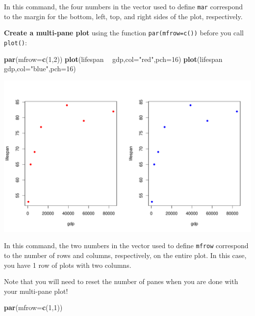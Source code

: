 \documentclass[
]{book}
\newenvironment{Shaded}{\begin{snugshade}}{\end{snugshade}}
\newcommand{\DataTypeTok}[1]{\textcolor[rgb]{0.13,0.29,0.53}{#1}}
\newcommand{\DecValTok}[1]{\textcolor[rgb]{0.00,0.00,0.81}{#1}}
\newcommand{\KeywordTok}[1]{\textcolor[rgb]{0.13,0.29,0.53}{\textbf{#1}}}
\newcommand{\NormalTok}[1]{#1}
\newcommand{\OperatorTok}[1]{\textcolor[rgb]{0.81,0.36,0.00}{\textbf{#1}}}
\newcommand{\StringTok}[1]{\textcolor[rgb]{0.31,0.60,0.02}{#1}}
\begin{document}
In this command, the four numbers in the vector used to define \texttt{mar} correspond to the margin for the bottom, left, top, and right sides of the plot, respectively.

\textbf{Create a multi-pane plot} using the function \texttt{par(mfrow=c())} before you call \texttt{plot()}:

\begin{Shaded}
\begin{Highlighting}[]
\KeywordTok{par}\NormalTok{(}\DataTypeTok{mfrow=}\KeywordTok{c}\NormalTok{(}\DecValTok{1}\NormalTok{,}\DecValTok{2}\NormalTok{))}
\KeywordTok{plot}\NormalTok{(lifespan }\OperatorTok{~}\StringTok{ }\NormalTok{gdp,}\DataTypeTok{col=}\StringTok{"red"}\NormalTok{,}\DataTypeTok{pch=}\DecValTok{16}\NormalTok{)}
\KeywordTok{plot}\NormalTok{(lifespan }\OperatorTok{~}\StringTok{ }\NormalTok{gdp,}\DataTypeTok{col=}\StringTok{"blue"}\NormalTok{,}\DataTypeTok{pch=}\DecValTok{16}\NormalTok{)}
\end{Highlighting}
\end{Shaded}

\includegraphics{figures/unnamed-chunk-96-1.pdf}

In this command, the two numbers in the vector used to define \texttt{mfrow} correspond to the number of rows and columns, respectively, on the entire plot. In this case, you have 1 row of plots with two columns.

Note that you will need to reset the number of panes when you are done with your multi-pane plot!

\begin{Shaded}
\begin{Highlighting}[]
\KeywordTok{par}\NormalTok{(}\DataTypeTok{mfrow=}\KeywordTok{c}\NormalTok{(}\DecValTok{1}\NormalTok{,}\DecValTok{1}\NormalTok{))}
\end{Highlighting}
\end{Shaded}
\end{document}
